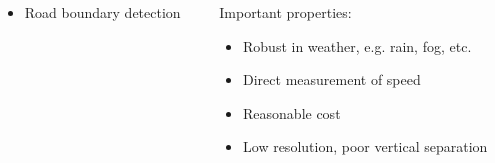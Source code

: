 \begin{frame}
\begin{columns}[T]
\begin{column}{.6\textwidth}
\begin{columns}[T]
\begin{column}{0.4\textwidth}
\begin{itemize}
                    \item Road boundary detection
                \end{itemize}
            \end{column}
            \begin{column}{0.6\textwidth}
                \footnotesize
                Important properties:
                \begin{itemize}
                    \item Robust in weather, e.g. rain, fog, etc.
                    \item Direct measurement of speed
                    \item Reasonable cost
                    \item Low resolution, poor vertical separation
                \end{itemize}
            \end{column}
        \end{columns}
    \end{column}
\end{columns}
\end{frame}

